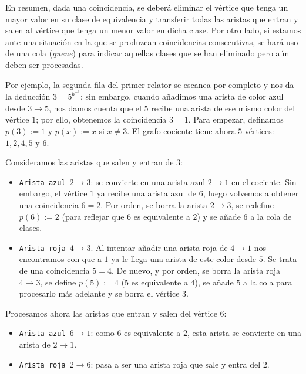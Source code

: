 En resumen, dada una coincidencia, se deberá eliminar el vértice que tenga un mayor valor en su clase de equivalencia  y transferir todas las aristas que entran y salen al vértice que tenga un menor valor en dicha clase. Por otro lado, si estamos ante una situación en la que se produzcan coincidencias consecutivas, se hará uso de una cola (\textit{queue}) para indicar aquellas clases que se han eliminado pero aún deben ser procesadas.

Por ejemplo, la segunda fila del primer relator se escanea por completo y nos da la deducción $3=5^{b^{-1}}$; sin embargo, cuando añadimos una arista de color azul desde $3\rightarrow5$, nos damos cuenta que el $5$ recibe una arista de ese mismo color del vértice $1$; por ello, obtenemos la coincidencia $3=1$.
Para empezar, definamos $p(3):=1$ y $p(x):=x$ si $x \not = 3$. El grafo cociente tiene ahora $5$ vértices: $1,2,4,5$ y $6$.


Consideramos las aristas que salen y entran de $3$:
\begin{itemize}
    \item \texttt{Arista azul $2\rightarrow 3$}: se convierte en una arista azul $2\rightarrow1$ en el cociente. Sin embargo, el vértice $1$ ya recibe una arista azul de $6$, luego volvemos a obtener una coincidencia $6=2$. Por orden, se borra la arista $2 \rightarrow 3$, se redefine $p(6):=2$ (para reflejar que $6$ es equivalente a $2$) y se añade $6$ a la cola de clases.
    
    \item \texttt{Arista roja $4\rightarrow3$}. Al intentar añadir una arista roja de $4\rightarrow1$ nos encontramos con que a $1$ ya le llega una arista de este color desde $5$. Se trata de una coincidencia $5=4$. De nuevo, y por orden, se borra la arista roja $4\rightarrow3$, se define $p(5):=4$ ($5$ es equivalente a $4$), se añade $5$ a la cola para procesarlo más adelante y se borra el vértice $3$.
\end{itemize}

Procesamos ahora las aristas que entran y salen del vértice $6$:
\begin{itemize}
    \item \texttt{Arista azul $6\rightarrow1$}: como $6$ es equivalente a $2$, esta arista se convierte en una arista de $2\rightarrow1$.
    \item \texttt{Arista roja $2\rightarrow6$}:  pasa a ser una arista roja que sale y entra del $2$.
\end{itemize}

